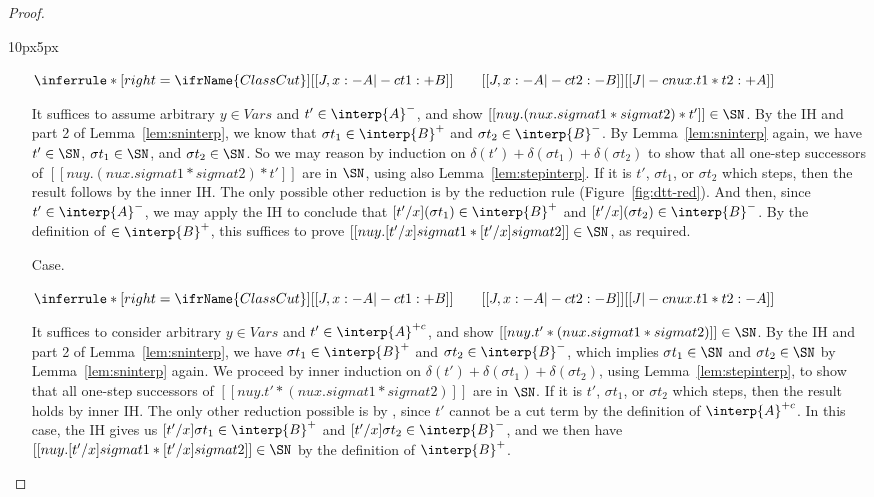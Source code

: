 \begin{proof}
\begin{changemargin}{10px}{5px}
\begin{itemize}
\vspace{-.2cm}
\begin{center}
\begin{math}
\inferrule* [right=\ifrName{ClassCut}] {[[ J , x : - A  |-c t1 : + B ]]  \qquad [[  J , x : - A  |-c t2 : - B ]]}{[[  J |-c nu x . t1 * t2 : + A ]]}
\end{math}
\end{center}
It suffices to assume arbitrary $y\in\textit{Vars}$ and
$t'\in\interp{A}^-$, and show $[[nu y . (nu x . sigma t1 * sigma t2) *
t']]\in\SN$.  By the IH and part 2 of Lemma~\ref{lem:sninterp}, we
know that $\sigma t_1\in\interp{B}^+$ and $\sigma t_2\in\interp{B}^-$.
By Lemma~\ref{lem:sninterp} again, we have $t'\in\SN$, $\sigma
t_1\in\SN$, and $\sigma t_2\in\SN$.  So we may reason by induction on
$\delta(t')+\delta(\sigma t_1)+\delta(\sigma t_2)$ to show that all
one-step successors of $[[nu y . (nu x . sigma t1 * sigma t2) * t']]$
are in $\SN$, using also Lemma~\ref{lem:stepinterp}.  If it is $t'$,
$\sigma t_1$, or $\sigma t_2$ which steps, then the result follows by
the inner IH.  The only possible other reduction is by the
 reduction rule (Figure~\ref{fig:dtt-red}).  And
then, since $t'\in\interp{A}^-$, we may apply the IH to conclude that
$[t'/x](\sigma t_1)\in\interp{B}^+$ and $[t'/x](\sigma t_2)\in\interp{B}^-$.
By the definition of $\in\interp{B}^+$, this suffices to prove
$[[nu y . [t'/x] sigma t1 * [t'/x]sigma t2]]\in\SN$, as required.

\item[Case.]\ 

\vspace{-.2cm}
\begin{center}
\begin{math}
\inferrule* [right=\ifrName{ClassCut}] {[[ J , x : - A  |-c t1 : + B ]]  \qquad [[  J , x : - A  |-c t2 : - B ]]}{[[  J |-c nu x . t1 * t2 : - A ]]}
\end{math}
\end{center}
It suffices to consider arbitrary $y\in\textit{Vars}$ and
$t'\in\interp{A}^{+c}$, and show $[[nu y. t' * (nu x . sigma t1 *
sigma t2)]]\in\SN$.  By the IH and part 2 of Lemma~\ref{lem:sninterp},
we have $\sigma t_1\in\interp{B}^+$ and $\sigma t_2\in\interp{B}^-$,
which implies $\sigma t_1\in\SN$ and $\sigma t_2\in\SN$ by
Lemma~\ref{lem:sninterp} again.  We proceed by inner induction on
$\delta(t')+\delta(\sigma t_1)+\delta(\sigma t_2)$, using
Lemma~\ref{lem:stepinterp}, to show that all one-step successors of
$[[nu y. t' * (nu x . sigma t1 * sigma t2)]]$ are in $\SN$.  If it is
$t'$, $\sigma t_1$, or $\sigma t_2$ which steps, then the result holds
by inner IH.  The only other reduction possible is by
, since $t'$ cannot be a cut term by the
definition of $\interp{A}^{+c}$.  In this case, the IH gives us
$[t'/x]\sigma t_1\in\interp{B}^+$ and $[t'/x]\sigma
t_2\in\interp{B}^-$, and we then have $[[nu y . [t'/x]sigma t1 *
[t'/x]sigma t2]]\in\SN$ by the definition of $\interp{B}^+$.
\end{itemize}
\end{changemargin}
\end{proof}

